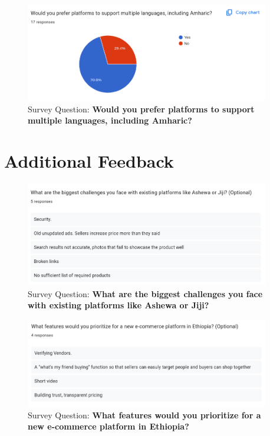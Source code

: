 \documentclass[12pt]{report}
\begin{document}
\begin{appendices}
	\begin{figure}[H]
		\begin{center}
			\includegraphics[width=0.95\textwidth]{survey/q21}
		\end{center}
		\caption{Survey Question: \textbf{Would you prefer platforms to support multiple languages, including Amharic?}}
	\end{figure}

	\section{Additional Feedback}

	\begin{figure}[H]
		\begin{center}
			\includegraphics[width=0.95\textwidth]{survey/q22}
		\end{center}
		\caption{Survey Question: \textbf{What are the biggest challenges you face with existing platforms like Ashewa or Jiji?}}
	\end{figure}

	\begin{figure}[H]
		\begin{center}
			\includegraphics[width=0.95\textwidth]{survey/q23}
		\end{center}
		\caption{Survey Question: \textbf{What features would you prioritize for a new e-commerce platform in Ethiopia?}}
	\end{figure}
\end{appendices}
\end{document}
